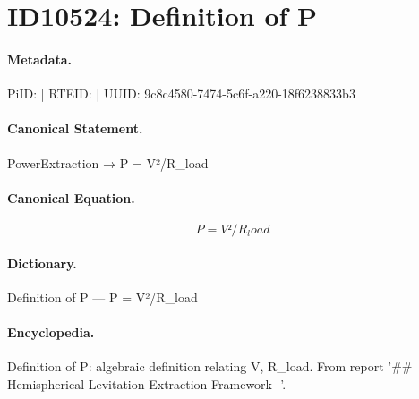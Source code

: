 \section*{ID10524: Definition of P}
\paragraph{Metadata.}
PiID:  | RTEID:  | UUID: 9c8c4580-7474-5c6f-a220-18f6238833b3

\paragraph{Canonical Statement.}
PowerExtraction → P = V²/R\_load

\paragraph{Canonical Equation.}
\[
P = V²/R_load
\]

\paragraph{Dictionary.}
Definition of P — P = V²/R\_load

\paragraph{Encyclopedia.}
Definition of P: algebraic definition relating V, R\_load. From report '\#\# Hemispherical Levitation-Extraction Framework- '.
